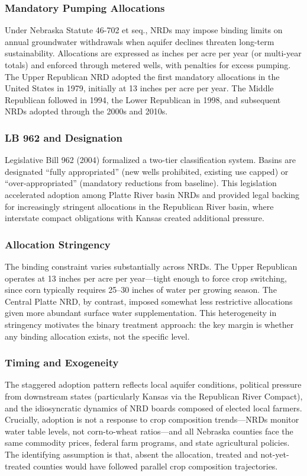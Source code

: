 \documentclass[12pt]{article}
\begin{document}
\subsubsection*{Mandatory Pumping Allocations} Under Nebraska Statute 46-702 et seq., NRDs may impose binding limits on annual groundwater withdrawals when aquifer declines threaten long-term sustainability. Allocations are expressed as inches per acre per year (or multi-year totals) and enforced through metered wells, with penalties for excess pumping. The Upper Republican NRD adopted the first mandatory allocations in the United States in 1979, initially at 13 inches per acre per year. The Middle Republican followed in 1994, the Lower Republican in 1998, and subsequent NRDs adopted through the 2000s and 2010s.

\subsubsection*{LB 962 and Designation} Legislative Bill 962 (2004) formalized a two-tier classification system. Basins are designated ``fully appropriated'' (new wells prohibited, existing use capped) or ``over-appropriated'' (mandatory reductions from baseline). This legislation accelerated adoption among Platte River basin NRDs and provided legal backing for increasingly stringent allocations in the Republican River basin, where interstate compact obligations with Kansas created additional pressure.

\subsubsection*{Allocation Stringency} The binding constraint varies substantially across NRDs. The Upper Republican operates at 13 inches per acre per year---tight enough to force crop switching, since corn typically requires 25--30 inches of water per growing season. The Central Platte NRD, by contrast, imposed somewhat less restrictive allocations given more abundant surface water supplementation. This heterogeneity in stringency motivates the binary treatment approach: the key margin is whether any binding allocation exists, not the specific level.

\subsubsection*{Timing and Exogeneity} The staggered adoption pattern reflects local aquifer conditions, political pressure from downstream states (particularly Kansas via the Republican River Compact), and the idiosyncratic dynamics of NRD boards composed of elected local farmers. Crucially, adoption is not a response to crop composition trends---NRDs monitor water table levels, not corn-to-wheat ratios---and all Nebraska counties face the same commodity prices, federal farm programs, and state agricultural policies. The identifying assumption is that, absent the allocation, treated and not-yet-treated counties would have followed parallel crop composition trajectories.
\end{document}
